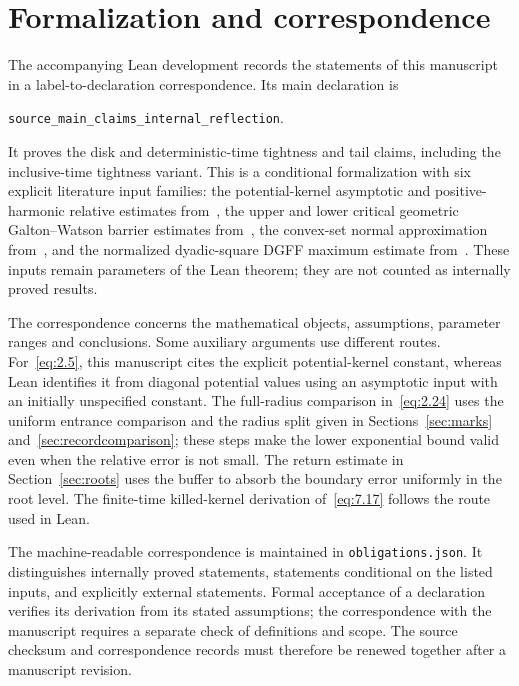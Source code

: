 \documentclass[11pt,a4paper]{article}
\numberwithin{equation}{section}
\theoremstyle{remark}
\begin{document}
\appendix
\section{Formalization and correspondence}\label{sec:formalization}
The accompanying Lean development records the statements of this manuscript in a label-to-declaration correspondence. Its main declaration is
\begin{center}
\texttt{source\_main\_claims\_internal\_reflection}.
\end{center}
It proves the disk and deterministic-time tightness and tail claims, including the inclusive-time tightness variant. This is a conditional formalization with six explicit literature input families: the potential-kernel asymptotic and positive-harmonic relative estimates from~\cite{LL}, the upper and lower critical geometric Galton--Watson barrier estimates from~\cite{GW}, the convex-set normal approximation from~\cite{BE}, and the normalized dyadic-square DGFF maximum estimate from~\cite{BDZ}. These inputs remain parameters of the Lean theorem; they are not counted as internally proved results.

The correspondence concerns the mathematical objects, assumptions, parameter ranges and conclusions. Some auxiliary arguments use different routes. For~\eqref{eq:2.5}, this manuscript cites the explicit potential-kernel constant, whereas Lean identifies it from diagonal potential values using an asymptotic input with an initially unspecified constant. The full-radius comparison in~\eqref{eq:2.24} uses the uniform entrance comparison and the radius split given in Sections~\ref{sec:marks} and~\ref{sec:recordcomparison}; these steps make the lower exponential bound valid even when the relative error is not small. The return estimate in Section~\ref{sec:roots} uses the buffer to absorb the boundary error uniformly in the root level. The finite-time killed-kernel derivation of~\eqref{eq:7.17} follows the route used in Lean.

The machine-readable correspondence is maintained in \texttt{obligations.json}. It distinguishes internally proved statements, statements conditional on the listed inputs, and explicitly external statements. Formal acceptance of a declaration verifies its derivation from its stated assumptions; the correspondence with the manuscript requires a separate check of definitions and scope. The source checksum and correspondence records must therefore be renewed together after a manuscript revision.
\end{document}
